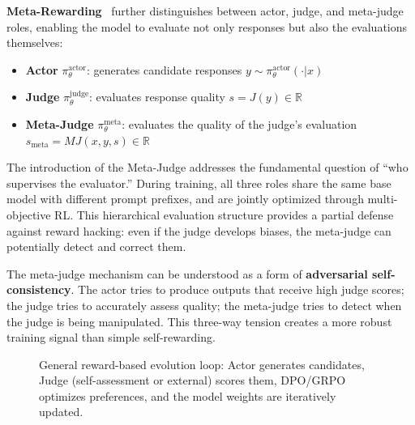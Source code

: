 \textbf{Meta-Rewarding}~\citep{metarewarding2024} further distinguishes between actor, judge, and meta-judge roles, enabling the model to evaluate not only responses but also the evaluations themselves:

\begin{itemize}
\item \textbf{Actor} $\pi_\theta^{\mathrm{actor}}$: generates candidate responses $y \sim \pi_\theta^{\mathrm{actor}}(\cdot | x)$
\item \textbf{Judge} $\pi_\theta^{\mathrm{judge}}$: evaluates response quality $s = J(y) \in \mathbb{R}$
\item \textbf{Meta-Judge} $\pi_\theta^{\mathrm{meta}}$: evaluates the quality of the judge's evaluation $s_{\mathrm{meta}} = MJ(x, y, s) \in \mathbb{R}$
\end{itemize}

The introduction of the Meta-Judge addresses the fundamental question of ``who supervises the evaluator.'' During training, all three roles share the same base model with different prompt prefixes, and are jointly optimized through multi-objective RL. This hierarchical evaluation structure provides a partial defense against reward hacking: even if the judge develops biases, the meta-judge can potentially detect and correct them.

The meta-judge mechanism can be understood as a form of \textbf{adversarial self-consistency}. The actor tries to produce outputs that receive high judge scores; the judge tries to accurately assess quality; the meta-judge tries to detect when the judge is being manipulated. This three-way tension creates a more robust training signal than simple self-rewarding.

\begin{figure}[htbp]
\centering
{}
\caption{General reward-based evolution loop: Actor generates candidates, Judge (self-assessment or external) scores them, DPO/GRPO optimizes preferences, and the model weights are iteratively updated.}
\label{fig:ch3-reward-loop}
\end{figure}


